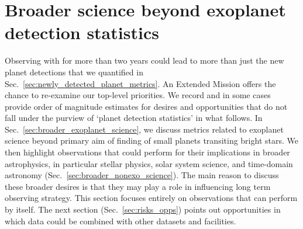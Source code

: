 \section{Broader science beyond exoplanet detection statistics}
\label{sec:broader_science_beyond_planet_detection_stats}


Observing with \tess for more than two years could lead to more than just the new planet detections that we quantified in Sec.~\ref{sec:newly_detected_planet_metrics}.
An Extended Mission offers the chance to re-examine our top-level priorities. %
We record and in some cases provide order of magnitude estimates for desires and opportunities that do not fall under the purview of `planet detection statistics' in what follows.
In Sec.~\ref{sec:broader_exoplanet_science}, we discuss metrics related to exoplanet science beyond \tesss primary aim of finding of small planets transiting bright stars.
We then highlight observations that \tess could perform for their implications in broader astrophysics, in particular stellar physics, solar system science, and time-domain astronomy (Sec.~\ref{sec:broader_nonexo_science}).
The main reason to discuss these broader desires is that they may play a role in influencing \tesss long term observing strategy.
This section focuses entirely on observations that \tess can perform by itself.
The next section (Sec.~\ref{sec:risks_opps}) points out opportunities in which \tess data could be combined with other datasets and facilities.





